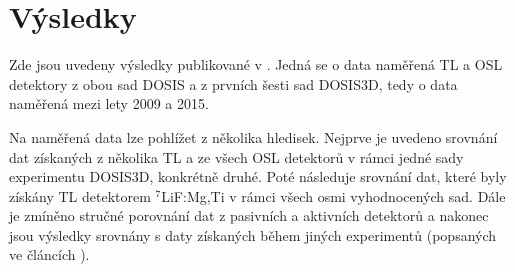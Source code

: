 \section{Výsledky}
Zde jsou uvedeny výsledky publikované v \cite{dosis}. Jedná se o data naměřená TL a OSL detektory z obou sad DOSIS a z prvních šesti sad DOSIS3D, tedy o data naměřená mezi lety 2009 a 2015. %

Na naměřená data lze pohlížet z několika hledisek. Nejprve je uvedeno srovnání dat získaných z několika TL a ze všech OSL detektorů v rámci jedné sady experimentu DOSIS3D, konkrétně druhé. Poté následuje srovnání dat, které byly získány TL detektorem $^7$LiF:Mg,Ti v rámci všech osmi vyhodnocených sad. Dále je zmíněno stručné porovnání dat z pasivních a aktivních detektorů a nakonec jsou výsledky srovnány s daty získaných během jiných experimentů (popsaných ve článcích \cite{passDetectors, dataTLD_RR, ambrozova_dvaExperimenty}).
